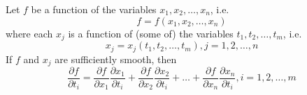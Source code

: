 \begin{mydef}
\normalfont Let \(f\) be a function of the variables \(x_1, x_2, \hdots, x_n\), i.e. 
%
\[f = f(x_1, x_2, \hdots, x_n)\]
%
where each \(x_j\) is a function of (some of) the variables \(t_1, t_2, \hdots, t_m\), i.e. 
%
\[x_j = x_j(t_1, t_2, \hdots, t_m), j = 1, 2, \hdots, n\]
%
If \(f\) and \(x_j\) are sufficiently smooth, then
%
\[\frac{\partial f}{\partial t_i} = \frac{\partial f}{\partial x_1}\frac{\partial x_1}{\partial t_i} + \frac{\partial f}{\partial x_2}\frac{\partial x_2}{\partial t_i} + \hdots + \frac{\partial f}{\partial x_n}\frac{\partial x_n}{\partial t_i}, i = 1,2,\hdots, m\]
%
\end{mydef}



























